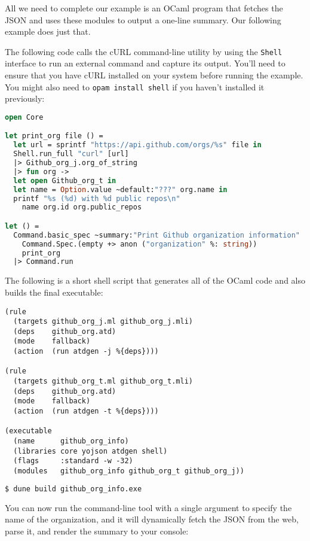 All we need to complete our example is an OCaml program that fetches the
JSON and uses these modules to output a one-line summary. Our following
example does just that.

The following code calls the cURL command-line utility by using the
\passthrough{\lstinline!Shell!} interface to run an external command and
capture its output. You'll need to ensure that you have cURL installed
on your system before running the example. You might also need to
\passthrough{\lstinline!opam install shell!} if you haven't installed it
previously:

\begin{lstlisting}[language=Caml]
open Core

let print_org file () =
  let url = sprintf "https://api.github.com/orgs/%s" file in
  Shell.run_full "curl" [url]
  |> Github_org_j.org_of_string
  |> fun org ->
  let open Github_org_t in
  let name = Option.value ~default:"???" org.name in
  printf "%s (%d) with %d public repos\n"
    name org.id org.public_repos

let () =
  Command.basic_spec ~summary:"Print Github organization information"
    Command.Spec.(empty +> anon ("organization" %: string))
    print_org
  |> Command.run
\end{lstlisting}

The following is a short shell script that generates all of the OCaml
code and also builds the final executable:

\begin{lstlisting}
(rule
  (targets github_org_j.ml github_org_j.mli)
  (deps    github_org.atd)
  (mode    fallback)
  (action  (run atdgen -j %{deps})))

(rule
  (targets github_org_t.ml github_org_t.mli)
  (deps    github_org.atd)
  (mode    fallback)
  (action  (run atdgen -t %{deps})))

(executable
  (name      github_org_info)
  (libraries core yojson atdgen shell)
  (flags     :standard -w -32)
  (modules   github_org_info github_org_t github_org_j))
\end{lstlisting}

\begin{lstlisting}[language=bash]
$ dune build github_org_info.exe
\end{lstlisting}

You can now run the command-line tool with a single argument to specify
the name of the organization, and it will dynamically fetch the JSON
from the web, parse it, and render the summary to your console:

